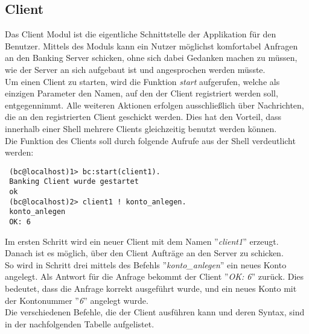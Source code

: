 \subsection{Client}
Das Client Modul ist die eigentliche Schnittstelle der Applikation für den Benutzer. Mittels des Moduls kann ein Nutzer möglichst komfortabel Anfragen an den Banking Server schicken, ohne sich dabei Gedanken machen zu müssen, wie der Server an sich aufgebaut ist und angesprochen werden müsste.\\
Um einen Client zu starten, wird die Funktion \textit{start} aufgerufen, welche als einzigen Parameter den Namen, auf den der Client registriert werden soll, entgegennimmt. Alle weiteren Aktionen erfolgen ausschließlich über Nachrichten, die an den registrierten Client geschickt werden. Dies hat den Vorteil, dass innerhalb einer Shell mehrere Clients gleichzeitig benutzt werden können.\\
Die Funktion des Clients soll durch folgende Aufrufe aus der Shell verdeutlicht werden:
\begin{lstlisting} 
 (bc@localhost)1> bc:start(client1).
 Banking Client wurde gestartet
 ok
 (bc@localhost)2> client1 ! konto_anlegen.
 konto_anlegen
 OK: 6
\end{lstlisting}
Im ersten Schritt wird ein neuer Client mit dem Namen ''\textit{client1}'' erzeugt. Danach ist es möglich, über den Client Aufträge an den Server zu schicken.\\ 
So wird in Schritt drei mittels des Befehls ''\textit{konto\_anlegen}'' ein neues Konto angelegt. Als Antwort für die Anfrage bekommt der Client ''\textit{OK: 6}'' zurück. Dies bedeutet, dass die Anfrage korrekt ausgeführt wurde, und ein neues Konto mit der Kontonummer ''\textit{6}'' angelegt wurde.\\
Die verschiedenen Befehle, die der Client ausführen kann und deren Syntax, sind in der nachfolgenden Tabelle aufgelistet.\\
